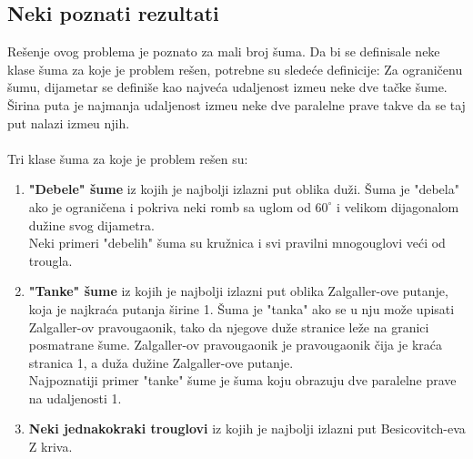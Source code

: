 \documentclass[11pt,letter]{article}
\begin{document}
\subsection[Neki poznati rezultati]{Neki poznati rezultati}
\bigskip
Re\v senje ovog problema je poznato za mali broj \v suma. Da bi se definisale neke klase \v suma za koje je problem re\v sen, potrebne su slede\' ce definicije:
\df Za ograni\v cenu \v sumu, dijametar se defini\v se kao najve\' ca udaljenost izme\dj u neke dve ta\v cke \v sume.
\df \v Sirina puta je najmanja udaljenost izme\dj u neke dve paralelne prave takve da se taj put nalazi izme\dj u njih.
\\
\bigskip
\\
Tri klase \v suma za koje je problem re\v sen su:
\begin{enumerate}
\item \textbf{"Debele" \v sume} iz kojih je najbolji izlazni put oblika du\v zi. \v Suma je "debela" ako je ograni\v cena i pokriva neki romb sa uglom od $60^\circ$ i velikom dijagonalom du\v zine svog dijametra.
\\
Neki primeri  "debelih" \v suma su kru\v znica i svi pravilni mnogouglovi ve\' ci od trougla.
\item \textbf{"Tanke" \v sume} iz kojih je najbolji izlazni put oblika Zalgaller-ove putanje, koja je najkra\' ca putanja \v sirine 1. \v Suma je "tanka" ako se u nju mo\v ze upisati Zalgaller-ov pravougaonik, tako da njegove du\v ze stranice le\v ze na granici posmatrane \v sume. Zalgaller-ov pravougaonik je pravougaonik \v cija je kra\' ca stranica 1, a du\v za du\v zine Zalgaller-ove putanje.
\\
Najpoznatiji primer "tanke" \v sume je \v suma koju obrazuju dve paralelne prave na udaljenosti 1.
\item \textbf{Neki jednakokraki trouglovi} iz kojih je najbolji izlazni put Besicovitch-eva Z kriva.
\end{enumerate}
\end{document}
